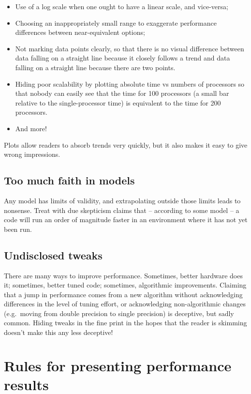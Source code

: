 \documentclass[12pt, leqno]{article} %
\begin{document}
\begin{itemize}
\item
  Use of a log scale when one ought to have a linear scale, and
  vice-versa;
\item
  Choosing an inappropriately small range to exaggerate performance
  differences between near-equivalent options;
\item
  Not marking data points clearly, so that there is no visual difference
  between data falling on a straight line because it closely follows a
  trend and data falling on a straight line because there are two
  points.
\item
  Hiding poor scalability by plotting absolute time vs numbers of
  processors so that nobody can easily see that the time for 100
  processors (a small bar relative to the single-processor time) is
  equivalent to the time for 200 processors.
\item
  And more!
\end{itemize}

Plots allow readers to absorb trends very quickly, but it also makes it
easy to give wrong impressions.

\subsection{Too much faith in models}

Any model has limits of validity, and extrapolating outside those limits
leads to nonsense. Treat with due skepticism claims that -- according to
some model -- a code will run an order of magnitude faster in an
environment where it has not yet been run.

\subsection{Undisclosed tweaks}

There are many ways to improve performance. Sometimes, better hardware
does it; sometimes, better tuned code; sometimes, algorithmic
improvements. Claiming that a jump in performance comes from a new
algorithm without acknowledging differences in the level of tuning
effort, or acknowledging non-algorithmic changes (e.g.~moving from
double precision to single precision) is deceptive, but sadly common.
Hiding tweaks in the fine print in the hopes that the reader is skimming
doesn't make this any less deceptive!

\section{Rules for presenting performance results}
\end{document}
